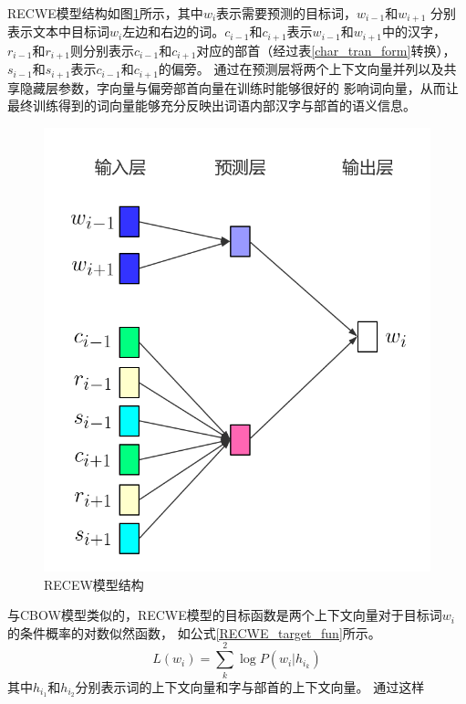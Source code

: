 RECWE模型结构如图\ref{RECWE}所示，其中$w_i$表示需要预测的目标词，$w_{i-1}$和$w_{i+1}$
分别表示文本中目标词$w_i$左边和右边的词。$c_{i-1}$和$c_{i+1}$表示$w_{i-1}$和$w_{i+1}$中的汉字，
$r_{i-1}$和$r_{i+1}$则分别表示$c_{i-1}$和$c_{i+1}$对应的部首（经过表\ref{char_tran_form}转换），
$s_{i-1}$和$s_{i+1}$表示$c_{i-1}$和$c_{i+1}$的偏旁。
通过在预测层将两个上下文向量并列以及共享隐藏层参数，字向量与偏旁部首向量在训练时能够很好的
影响词向量，从而让最终训练得到的词向量能够充分反映出词语内部汉字与部首的语义信息。
\begin{figure}[h]
    \includegraphics[scale=0.4]{picture/RECWE.png}
    \caption{RECEW模型结构}
    \label{RECWE}
\end{figure}

与CBOW模型类似的，RECWE模型的目标函数是两个上下文向量对于目标词$w_i$的条件概率的对数似然函数，
如公式\ref{RECWE_target_fun}所示。
\begin{equation}
    L\left ( w_i \right )= \sum_{k}^{2}\log P\left ( w_i | h_{i_k} \right )
    \label{RECWE_target_fun}
\end{equation}
其中$h_{i_1}$和$h_{i_2}$分别表示词的上下文向量和字与部首的上下文向量。
通过这样

